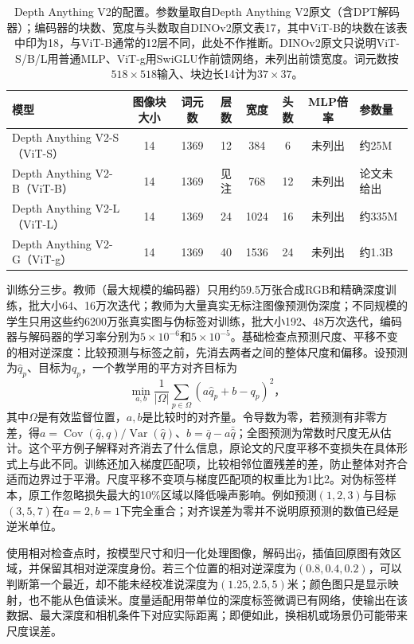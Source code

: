 \begin{table}[tbp]
 \centering
 \small
 \begin{tabular}{@{}lccccccl@{}}
 \toprule
 模型 & 图像块大小 & 词元数 & 层数 & 宽度 & 头数 & MLP倍率 & 参数量\\
 \midrule
 Depth Anything V2-S（ViT-S） & 14 & 1369 & 12 & 384 & 6 & 未列出 & 约25M\\
 Depth Anything V2-B（ViT-B） & 14 & 1369 & 见注 & 768 & 12 & 未列出 & 论文未给出\\
 Depth Anything V2-L（ViT-L） & 14 & 1369 & 24 & 1024 & 16 & 未列出 & 约335M\\
 Depth Anything V2-G（ViT-g） & 14 & 1369 & 40 & 1536 & 24 & 未列出 & 约1.3B\\
 \bottomrule
 \end{tabular}
 \caption{Depth Anything V2的配置。参数量取自Depth Anything V2原文（含DPT解码器）；编码器的块数、宽度与头数取自DINOv2原文表17，其中ViT-B的块数在该表中印为18，与ViT-B通常的12层不同，此处不作推断。DINOv2原文只说明ViT-S/B/L用普通MLP、ViT-g用SwiGLU作前馈网络，未列出前馈宽度。词元数按$518\times518$输入、块边长14计为$37\times37$。}
 \label{tab:vision-recognition-dav2-config}
\end{table}

训练分三步。教师（最大规模的编码器）只用约59.5万张合成RGB和精确深度训练，批大小64、16万次迭代；教师为大量真实无标注图像预测伪深度；不同规模的学生只用这些约6200万张真实图与伪标签对训练，批大小192、48万次迭代，编码器与解码器的学习率分别为$5\times10^{-6}$和$5\times10^{-5}$。基础检查点预测尺度、平移不变的相对逆深度：比较预测与标签之前，先消去两者之间的整体尺度和偏移。设预测为$\hat q_p$、目标为$q_p$，一个教学用的平方对齐目标为
\begin{equation}
 \min_{a,b}\frac1{|\Omega|}
       \sum_{p\in\Omega}(a\hat q_p+b-q_p)^2\text{，}
 \label{eq:vision-relative-depth-alignment}
\end{equation}
其中$\Omega$是有效监督位置，$a,b$是比较时的对齐量。令导数为零，若预测有非零方差，得$a=\operatorname{Cov}(\hat q,q)/\operatorname{Var}(\hat q)$、$b=\bar q-a\bar{\hat q}$；全图预测为常数时尺度无从估计。这个平方例子解释对齐消去了什么信息，原论文的尺度平移不变损失在具体形式上与此不同。训练还加入梯度匹配项，比较相邻位置残差的差，防止整体对齐合适而边界过于平滑。尺度平移不变项与梯度匹配项的权重比为1比2。对伪标签样本，原工作忽略损失最大的10\%区域以降低噪声影响。例如预测$(1,2,3)$与目标$(3,5,7)$在$a=2,b=1$下完全重合；对齐误差为零并不说明原预测的数值已经是逆米单位。

使用相对检查点时，按模型尺寸和归一化处理图像，解码出$\hat q$，插值回原图有效区域，并保留其相对逆深度身份。若三个位置的相对逆深度为$(0.8,0.4,0.2)$，可以判断第一个最近，却不能未经校准说深度为$(1.25,2.5,5)$米；颜色图只是显示映射，也不能从色值读米。度量适配用带单位的深度标签微调已有网络，使输出在该数据、最大深度和相机条件下对应实际距离；即便如此，换相机或场景仍可能带来尺度误差。

